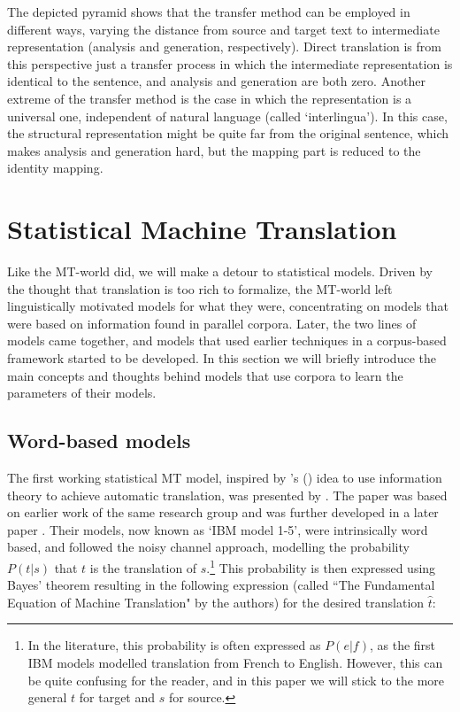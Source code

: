 \documentclass[a4paper, 11pt]{report}
\theoremstyle{definition}
\theoremstyle{plain}
\def\citepos#1{\citeauthor{#1}'s (\citeyear{#1})}
\begin{document}

The depicted pyramid shows that the transfer method can be employed in different ways, varying the distance from source and target text to intermediate representation (analysis and generation, respectively). Direct translation is from this perspective just a transfer process in which the intermediate representation is identical to the sentence, and analysis and generation are both zero. Another extreme of the transfer method is the case in which the representation is a universal one, independent of natural language (called `interlingua'). In this case, the structural representation might be quite far from the original sentence, which makes analysis and generation hard, but the mapping part is reduced to the identity mapping.

\section{Statistical Machine Translation}
\label{sec:SMT}

Like the MT-world did, we will make a detour to statistical models. Driven by the thought that translation is too rich to formalize, the MT-world left linguistically motivated models for what they were, concentrating on models
that were based on information found in parallel corpora. Later, the two lines of models came together, and models that used earlier techniques in a corpus-based framework started to be developed. In this section we will briefly introduce the main concepts and thoughts behind models that use corpora to learn the parameters of their models.

\subsection{Word-based models}
The first working statistical MT model, inspired by \citepos{weaver1955translation} idea to use information theory to achieve automatic translation, was presented by \cite{brown1990statistical}. The paper was based on earlier work of the same research group \citep{brown1988statistical} and was further developed in a later paper \citep{brown1993mathematics}. Their models, now known as `IBM model 1-5', were intrinsically word based, and followed the noisy channel approach, modelling the probability $P(t|s)$ that $t$ is the translation of $s$.\footnote{In the literature, this probability is often expressed as $P(e|f)$, as the first IBM models modelled translation from French to English. However, this can be quite confusing for the reader, and in this paper we will stick to the more general $t$ for target and $s$ for source.} This probability is then expressed using Bayes' theorem resulting in the following expression (called ``The Fundamental Equation of Machine Translation" by the authors) for the desired translation $\hat{t}$:
\end{document}
